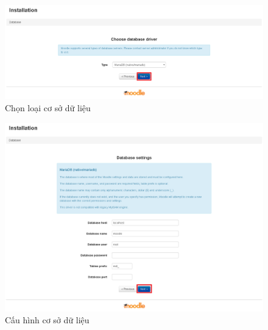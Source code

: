 \begin{center}
	\begin{figure}[htp]
		\begin{center}
			\includegraphics[width=1\linewidth]{img/2}
		\end{center}
		\caption{Chọn loại cơ sở dữ liệu}
		\label{refhinh32}
	\end{figure}
\end{center}

\begin{center}
	\begin{figure}[htp]
		\begin{center}
			\includegraphics[width=1\linewidth]{img/3}
		\end{center}
		\caption{Cấu hình cơ sở dữ liệu}
		\label{refhinh33}
	\end{figure}
\end{center}

